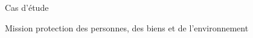 \begin{frame}{Cas d'étude}
\begin{block}{Mission}
protection des
personnes, des biens et de l’environnement
\end{block}



\end{frame}
